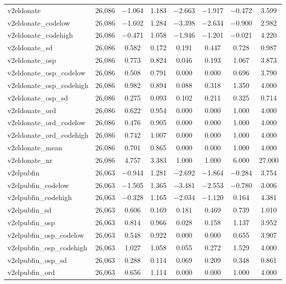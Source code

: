 \begin{table}[!htbp]
\begin{tabular}{@{\extracolsep{5pt}}lccccccc}
v2eldonate & 26,086 & $-$1.064 & 1.183 & $-$2.663 & $-$1.917 & $-$0.472 & 3.599 \\ 
v2eldonate\_codelow & 26,086 & $-$1.602 & 1.284 & $-$3.398 & $-$2.634 & $-$0.900 & 2.982 \\ 
v2eldonate\_codehigh & 26,086 & $-$0.471 & 1.058 & $-$1.946 & $-$1.201 & $-$0.021 & 4.220 \\ 
v2eldonate\_sd & 26,086 & 0.582 & 0.172 & 0.191 & 0.447 & 0.728 & 0.987 \\ 
v2eldonate\_osp & 26,086 & 0.773 & 0.824 & 0.046 & 0.193 & 1.067 & 3.873 \\ 
v2eldonate\_osp\_codelow & 26,086 & 0.508 & 0.791 & 0.000 & 0.000 & 0.696 & 3.790 \\ 
v2eldonate\_osp\_codehigh & 26,086 & 0.982 & 0.894 & 0.088 & 0.318 & 1.350 & 4.000 \\ 
v2eldonate\_osp\_sd & 26,086 & 0.275 & 0.093 & 0.102 & 0.211 & 0.325 & 0.714 \\ 
v2eldonate\_ord & 26,086 & 0.622 & 0.954 & 0.000 & 0.000 & 1.000 & 4.000 \\ 
v2eldonate\_ord\_codelow & 26,086 & 0.476 & 0.905 & 0.000 & 0.000 & 1.000 & 4.000 \\ 
v2eldonate\_ord\_codehigh & 26,086 & 0.742 & 1.007 & 0.000 & 0.000 & 1.000 & 4.000 \\ 
v2eldonate\_mean & 26,086 & 0.701 & 0.865 & 0.000 & 0.000 & 1.000 & 4.000 \\ 
v2eldonate\_nr & 26,086 & 4.757 & 3.383 & 1.000 & 1.000 & 6.000 & 27.000 \\ 
v2elpubfin & 26,063 & $-$0.944 & 1.281 & $-$2.692 & $-$1.864 & $-$0.284 & 3.754 \\ 
v2elpubfin\_codelow & 26,063 & $-$1.505 & 1.365 & $-$3.481 & $-$2.553 & $-$0.780 & 3.006 \\ 
v2elpubfin\_codehigh & 26,063 & $-$0.328 & 1.165 & $-$2.034 & $-$1.120 & 0.164 & 4.381 \\ 
v2elpubfin\_sd & 26,063 & 0.606 & 0.169 & 0.181 & 0.469 & 0.739 & 1.010 \\ 
v2elpubfin\_osp & 26,063 & 0.814 & 0.966 & 0.028 & 0.158 & 1.137 & 3.952 \\ 
v2elpubfin\_osp\_codelow & 26,063 & 0.548 & 0.922 & 0.000 & 0.000 & 0.655 & 3.907 \\ 
v2elpubfin\_osp\_codehigh & 26,063 & 1.027 & 1.058 & 0.055 & 0.272 & 1.529 & 4.000 \\ 
v2elpubfin\_osp\_sd & 26,063 & 0.288 & 0.114 & 0.069 & 0.209 & 0.348 & 0.861 \\ 
v2elpubfin\_ord & 26,063 & 0.656 & 1.114 & 0.000 & 0.000 & 1.000 & 4.000 \\ 

\end{tabular}
\end{table}
